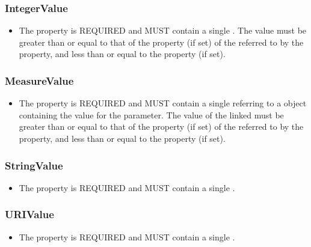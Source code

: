 \subsubsection{IntegerValue}
\label{sec:IntegerValue}

\begin{itemize}
\item \label{sec:IV:value}
The  property is REQUIRED and MUST contain a single .
The value must be greater than or equal to that of the  property (if set) of the  referred to by the  property, and less than or equal to the  property (if set).
\end{itemize}

\subsubsection{MeasureValue}
\label{sec:MeasureValue}

\begin{itemize}
\item \label{sec:hasValue}
The  property is REQUIRED and MUST contain a single  referring to a  object containing the value for the parameter.
The value of the linked  must be greater than or equal to that of the  property (if set) of the  referred to by the  property, and less than or equal to the  property (if set).
\end{itemize}


\subsubsection{StringValue}
\label{sec:StringValue}

\begin{itemize}
\item \label{sec:SV:value}
The  property is REQUIRED and MUST contain a single .
\end{itemize}


\subsubsection{URIValue}
\label{sec:URIValue}

\begin{itemize}
\item \label{sec:UV:value}
The  property is REQUIRED and MUST contain a single .
\end{itemize}










